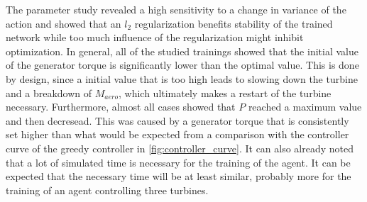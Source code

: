 The parameter study revealed a high sensitivity to a change in variance of the action and showed that an $l_2$ regularization benefits stability of the trained network while too much influence of the regularization might inhibit optimization. In general, all of the studied trainings showed that the initial value of the generator torque is significantly lower than the optimal value. This is done by design, since a initial value that is too high leads to slowing down the turbine and a breakdown of $M_{aero}$, which ultimately makes a restart of the turbine necessary. Furthermore, almost all cases showed that $P$ reached a maximum value and then decresead. This was caused by a generator torque that is consistently set higher than what would be expected from a comparison with the controller curve of the greedy controller in \autoref{fig:controller_curve}. It can also already noted that a lot of simulated time is necessary for the training of the agent. It can be expected that the necessary time will be at least similar, probably more for the training of an agent controlling three turbines. 